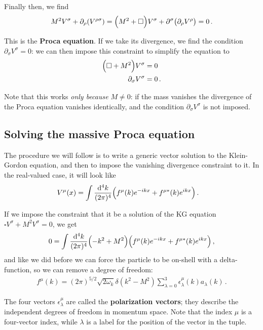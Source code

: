 \documentclass[main.tex]{subfiles}
\begin{document}
Finally then, we find 
%
\begin{align}
M^2 V^{\sigma } + \partial_{\rho } \qty(V^{\rho \sigma }) = \qty(M^2 + \square )V^{\sigma } + \partial^{\sigma }\qty(\partial_{\rho }V^{\rho }) = 0
\,.
\end{align}

This is the \textbf{Proca equation}. If we take its divergence, we find the condition \( \partial_{\sigma } V^{\sigma } = 0\): we can then impose this constraint to simplify the equation to 
%
\begin{align}
\qty(\square + M^2 ) V^{\sigma } &= 0   \\
\partial_{\sigma } V^{\sigma } &= 0
\,.
\end{align}

Note that this works \emph{only because} \(M \neq 0\): if the mass vanishes the divergence of the Proca equation vanishes identically, and the condition \(\partial_{\sigma } V^{\sigma }\) is not imposed. 

\subsection{Solving the massive Proca equation}

The procedure we will follow is to write a generic vector solution to the Klein-Gordon equation, and then to impose the vanishing divergence constraint to it. 
In the real-valued case, it will look like 
%
\begin{align}
V^{\mu } (x) &= \int \frac{ \dd[4]{k}}{(2 \pi )^{4}} \qty(f^{\mu }(k) e^{-ikx} + f^{\mu *} (k) e^{ikx}) 
\,.
\end{align}

If we impose the constraint that it be a solution of the KG equation \(\square V^{\sigma } + M^2 V^{\sigma } = 0\), we get 
%
\begin{align}
0= \int \frac{ \dd[4]{k}}{(2 \pi )^{4}} \qty(- k^2 + M^2) \qty(f^{\mu }(k) e^{-ikx} + f^{\mu *} (k) e^{ikx}) 
\,,
\end{align}
%
and like we did before we can force the particle to be on-shell with a delta-function, so we can remove a degree of freedom:
%
\begin{align}
f^{\mu }(k) = (2 \pi )^{5/2} \sqrt{2 \omega_{k}} \delta (k^2 - M^2)
\sum _{\lambda=0}^{3}
\epsilon^{\mu }_{\lambda }(k) a_\lambda (k)
\,.
\end{align}

The four vectors \(\epsilon^{\mu }_{\lambda }\) are called the \textbf{polarization vectors}; they describe the independent degrees of freedom in momentum space. Note that the index \(\mu \) is a four-vector index, while \(\lambda \) is a label for the position of the vector in the tuple. 
\end{document}
